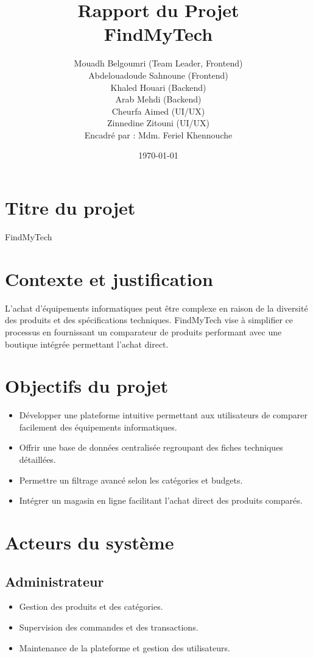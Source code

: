 \documentclass[a4paper,12pt]{article}
\title{Rapport du Projet \\ \textbf{FindMyTech}}
\author{Mouadh Belgoumri (Team Leader, Frontend) \\ Abdelouadoude Sahnoune (Frontend) \\ Khaled Houari (Backend) \\ Arab Mehdi (Backend) \\ Cheurfa Aimed (UI/UX) \\ Zinnedine Zitouni (UI/UX) \\ Encadré par : Mdm. Feriel Khennouche}
\date{\today}
\begin{document}
\maketitle
\tableofcontents

\section{Titre du projet}
FindMyTech

\section{Contexte et justification}
L'achat d'équipements informatiques peut être complexe en raison de la diversité des produits et des spécifications techniques. FindMyTech vise à simplifier ce processus en fournissant un comparateur de produits performant avec une boutique intégrée permettant l'achat direct.

\section{Objectifs du projet}
\begin{itemize}
    \item Développer une plateforme intuitive permettant aux utilisateurs de comparer facilement des équipements informatiques.
    \item Offrir une base de données centralisée regroupant des fiches techniques détaillées.
    \item Permettre un filtrage avancé selon les catégories et budgets.
    \item Intégrer un magasin en ligne facilitant l'achat direct des produits comparés.
\end{itemize}

\section{Acteurs du système}
\subsection{Administrateur}
\begin{itemize}
    \item Gestion des produits et des catégories.
    \item Supervision des commandes et des transactions.
    \item Maintenance de la plateforme et gestion des utilisateurs.
\end{itemize}
\end{document}
